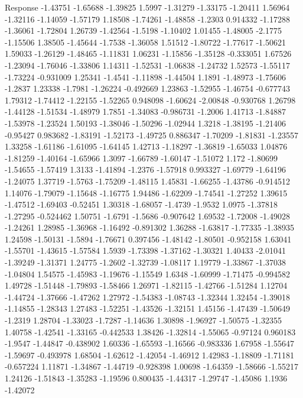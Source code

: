 \documentclass[9pt]{article}
\theoremstyle{plain}
\theoremstyle{definition}
\theoremstyle{remark}
\numberwithin{equation}{section}
\begin{document}
Response
-1.43751
-1.65688
-1.39825
1.5997
-1.31279
-1.33175
-1.20411
1.56964
-1.32116
-1.14059
-1.57179
1.18508
-1.74261
-1.48858
-1.2303
0.914332
-1.17288
-1.36061
-1.72804
1.26739
-1.42564
-1.5198
-1.10402
1.01455
-1.48005
-2.1775
-1.15506
1.38505
-1.45644
-1.7538
-1.36058
1.51512
-1.80722
-1.77617
-1.50621
1.59033
-1.26129
-1.48465
-1.11831
1.06231
-1.15856
-1.35128
-0.333051
1.67526
-1.23094
-1.76046
-1.33806
1.14311
-1.52531
-1.06838
-1.24732
1.52573
-1.55117
-1.73224
-0.931009
1.25341
-1.4541
-1.11898
-1.44504
1.1891
-1.48973
-1.75606
-1.2837
1.23338
-1.7981
-1.26224
-0.492669
1.23863
-1.52955
-1.46754
-0.677743
1.79312
-1.74412
-1.22155
-1.52265
0.948098
-1.60624
-2.00848
-0.930768
1.26798
-1.44128
-1.51534
-1.48979
1.7851
-1.34083
-0.986731
-1.2006
1.41713
-1.84887
-1.53978
-1.23524
1.50193
-1.38046
-1.50296
-1.02944
1.3218
-1.38195
-1.21406
-0.95427
0.983682
-1.83191
-1.52173
-1.49725
0.886347
-1.70209
-1.81831
-1.23557
1.33258
-1.61186
-1.61095
-1.64145
1.42713
-1.18297
-1.36819
-1.65033
1.04876
-1.81259
-1.40164
-1.65966
1.3097
-1.66789
-1.60147
-1.51072
1.172
-1.80699
-1.54655
-1.57419
1.3133
-1.41894
-1.2376
-1.57918
0.993327
-1.69779
-1.64196
-1.24075
1.37719
-1.5763
-1.75209
-1.48115
1.45831
-1.66255
-1.43786
-0.914512
1.14076
-1.79079
-1.15648
-1.16775
1.94486
-1.62209
-1.74541
-1.27252
1.39615
-1.47512
-1.69403
-0.52451
1.30318
-1.68057
-1.4739
-1.9532
1.0975
-1.37818
-1.27295
-0.524462
1.50751
-1.6791
-1.5686
-0.907642
1.69532
-1.72008
-1.49028
-1.24261
1.28985
-1.36968
-1.16492
-0.891302
1.36288
-1.63817
-1.77335
-1.38935
1.24598
-1.50131
-1.5894
-1.76671
0.397456
-1.48142
-1.80501
-0.952158
1.63041
-1.55701
-1.43615
-1.57584
1.5939
-1.73398
-1.37162
-1.30321
1.40433
-2.01041
-1.39249
-1.31371
1.24775
-1.2602
-1.32739
-1.08117
1.19779
-1.33867
-1.37038
-1.04804
1.54575
-1.45983
-1.19676
-1.15549
1.6348
-1.60999
-1.71475
-0.994582
1.49728
-1.51448
-1.79893
-1.58466
1.26971
-1.82115
-1.42766
-1.51284
1.12704
-1.44724
-1.37666
-1.47262
1.27972
-1.54383
-1.08743
-1.32344
1.32454
-1.39018
-1.14855
-1.28343
1.27483
-1.52251
-1.43526
-1.32151
1.45156
-1.47439
-1.50649
-1.2319
1.28704
-1.33023
-1.7287
-1.14636
1.30898
-1.96927
-1.50575
-1.32355
1.40758
-1.42541
-1.33165
-0.442533
1.38426
-1.32814
-1.55065
-0.97124
0.960183
-1.9547
-1.44847
-0.438902
1.60336
-1.65593
-1.16566
-0.983336
1.67958
-1.55647
-1.59697
-0.493978
1.68504
-1.62612
-1.42054
-1.46912
1.42983
-1.18809
-1.71181
-0.657224
1.11871
-1.34867
-1.44719
-0.928398
1.00698
-1.64359
-1.58666
-1.55217
1.24126
-1.51843
-1.35283
-1.19596
0.800435
-1.44317
-1.29747
-1.45086
1.1936
-1.42072
\end{document}
